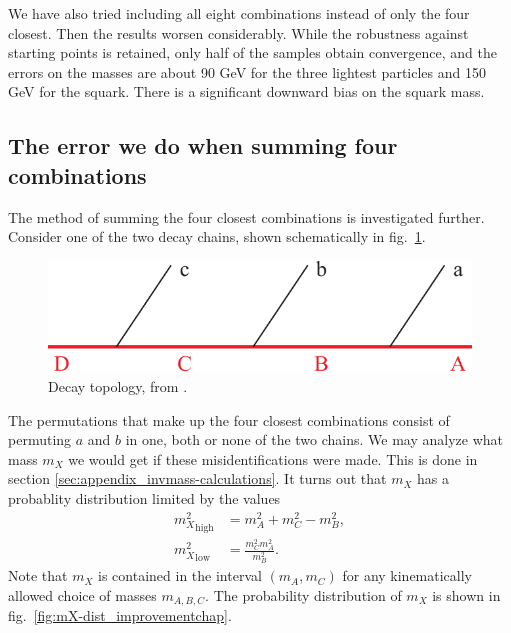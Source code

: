\documentclass[twoside,english]{uiofysmaster}
\begin{document}
We have also tried including all eight combinations instead of only the four closest. Then the results worsen considerably. While the robustness against starting points is retained, only half of the samples obtain convergence, and the errors on the masses are about 90 GeV for the three lightest particles and 150 GeV for the squark. There is a significant downward bias on the squark mass.

\subsection{The error we do when summing four combinations}
The method of summing the four closest combinations is investigated further. Consider one of the two decay chains, shown schematically in fig.\ \ref{fig:decaytree_improvementchap}.
\begin{figure}[hbt]
\centering
\includegraphics[scale=0.7]{figures/fig-chain.pdf} %
\caption{Decay topology, from \cite{Miller:2005zp}.}
\label{fig:decaytree_improvementchap}
\end{figure} The permutations that make up the four closest combinations consist of permuting $a$ and $b$ in one, both or none of the two chains. We may analyze what mass $m_X$ we would get if these misidentifications were made. This is done in section \ref{sec:appendix_invmass-calculations}. It turns out that $m_X$ has a probablity distribution limited by the values 
\begin{align}
	{m_X^2}_\mathrm{high} &= m_A^2 + m_C^2 - m_B^2,\\
	{m_X^2}_\mathrm{low} &= \frac{m_C^2 m_A^2}{m_B^2}.\nonumber
\end{align}
Note that $m_X$ is contained in the interval $(m_A, m_C)$ for any kinematically allowed choice of masses $m_{A,B,C}.$ The probability distribution of $m_X$ is shown in fig.\ \ref{fig:mX-dist_improvementchap}.
\end{document}
